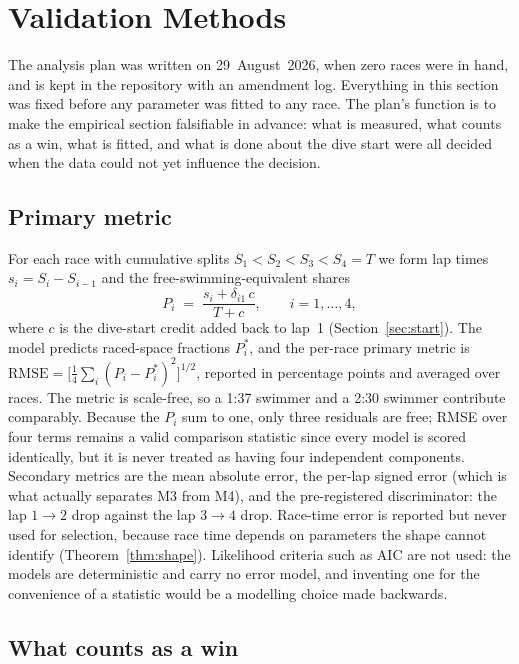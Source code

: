\section{Validation Methods}\label{sec:methods}

The analysis plan was written on 29~August~2026, when zero races were in
hand, and is kept in the repository with an amendment log. Everything in
this section was fixed before any parameter was fitted to any race. The
plan's function is to make the empirical section falsifiable in advance:
what is measured, what counts as a win, what is fitted, and what is done
about the dive start were all decided when the data could not yet influence
the decision.

\subsection{Primary metric}

For each race with cumulative splits $S_1<S_2<S_3<S_4=T$ we form lap times
$s_i=S_i-S_{i-1}$ and the free-swimming-equivalent shares
\begin{equation}
  P_i \;=\; \frac{s_i + \delta_{i1}\,c}{T + c}, \qquad i=1,\dots,4,
  \label{eq:shares}
\end{equation}
where $c$ is the dive-start credit added back to lap~1
(Section~\ref{sec:start}). The model predicts raced-space fractions
$P_i^\ast$, and the per-race primary metric is
$\mathrm{RMSE}=\big[\tfrac14\sum_i (P_i-P_i^\ast)^2\big]^{1/2}$, reported
in percentage points and averaged over races. The metric is scale-free, so a
1:37 swimmer and a 2:30 swimmer contribute comparably. Because the $P_i$ sum
to one, only three residuals are free; RMSE over four terms remains a valid
comparison statistic since every model is scored identically, but it is
never treated as having four independent components. Secondary metrics are
the mean absolute error, the per-lap signed error (which is what actually
separates M3 from M4), and the pre-registered discriminator: the lap
$1\!\to\!2$ drop against the lap $3\!\to\!4$ drop. Race-time error is
reported but never used for selection, because race time depends on
parameters the shape cannot identify (Theorem~\ref{thm:shape}). Likelihood
criteria such as AIC are not used: the models are deterministic and carry no
error model, and inventing one for the convenience of a statistic would be a
modelling choice made backwards.

\subsection{What counts as a win}

